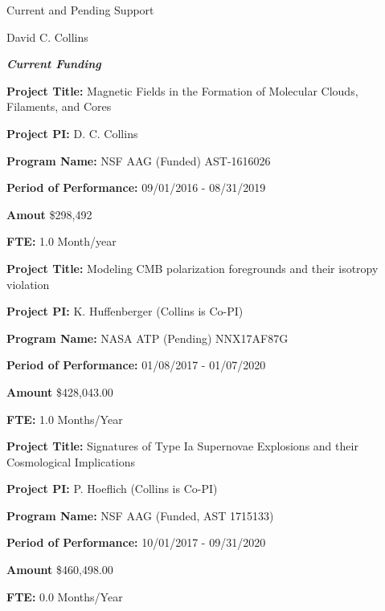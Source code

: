 \documentclass[11pt]{article}
\begin{document}
\newcommand{\LT}[1]{\noindent\textbf{#1}}
\begin{LARGE}
\noindent Current and Pending Support

\vspace{0.1in}
\noindent David C. Collins
\end{LARGE}



\vspace{0.1in}

\noindent \large{\textbf{\emph{Current Funding}}}

\vspace{0.1in}

\LT{Project Title:} Magnetic Fields in the Formation of Molecular Clouds,
Filaments, and Cores

\LT{Project PI:} D. C. Collins

\LT{Program Name:} NSF AAG (Funded) AST-1616026 

\LT{Period of Performance:} 09/01/2016 - 08/31/2019

\LT{Amout} \$298,492 

\LT{FTE:} 1.0 Month/year

\vspace{0.1in}


\LT{Project Title:} Modeling CMB polarization foregrounds and their isotropy
violation

\LT{Project PI:} K. Huffenberger (Collins is Co-PI)

\LT{Program Name:} NASA ATP (Pending)  NNX17AF87G

\LT{Period of Performance:} 01/08/2017 - 01/07/2020

\LT{Amount} \$428,043.00

\LT{FTE:} 1.0 Months/Year



\vspace{0.1in}

\LT{Project Title:} Signatures of Type Ia Supernovae Explosions and their
Cosmological Implications

\LT{Project PI:} P. Hoeflich (Collins is Co-PI)

\LT{Program Name:} NSF AAG (Funded, AST 1715133)

\LT{Period of Performance:} 10/01/2017 - 09/31/2020

\LT{Amount} \$460,498.00

\LT{FTE:} 0.0 Months/Year
\end{document}
